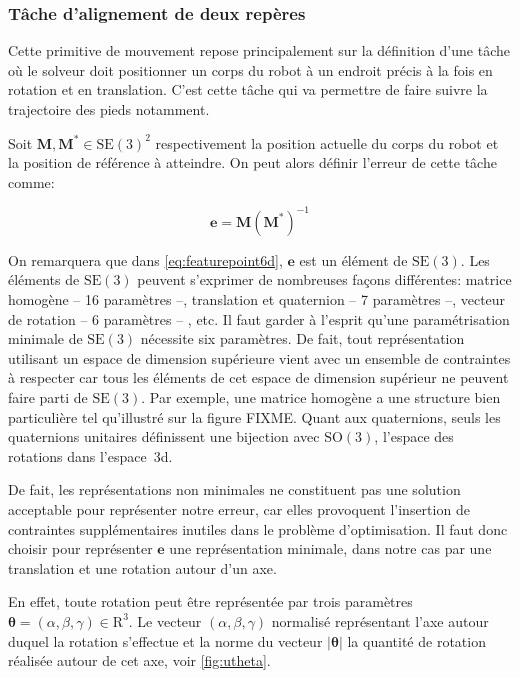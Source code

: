 \subsubsection{Tâche d'alignement de deux repères}

Cette primitive de mouvement repose principalement sur la définition
d'une tâche où le solveur doit positionner un corps du robot à un
endroit précis à la fois en rotation et en translation. C'est cette
tâche qui va permettre de faire suivre la trajectoire des pieds
notamment.


Soit $\mathbf{M}, \mathbf{M}^{*} \in \text{SE}(3)^2$
respectivement la position actuelle du corps du robot et la position
de référence à atteindre. On peut alors définir l'erreur de cette
tâche comme:

\begin{equation}\label{eq:featurepoint6d}
  \mathbf{e} = \mathbf{M} (\mathbf{M}^{*})^{-1}
\end{equation}

On remarquera que dans \autoref{eq:featurepoint6d}, $\mathbf{e}$ est
un élément de $\text{SE}(3)$. Les éléments de $\text{SE}(3)$ peuvent
s'exprimer de nombreuses façons différentes: matrice homogène -- 16
paramètres --, translation et quaternion -- 7 paramètres
--, vecteur de rotation -- 6 paramètres --
, etc. Il faut garder à l'esprit qu'une
paramétrisation minimale de $\text{SE}(3)$ nécessite six
paramètres. De fait, tout représentation utilisant un espace de
dimension supérieure vient avec un ensemble de contraintes à respecter
car tous les éléments de cet espace de dimension supérieur ne peuvent
faire parti de $\text{SE}(3)$. Par exemple, une matrice homogène a une
structure bien particulière tel qu'illustré sur la figure FIXME. Quant
aux quaternions, seuls les quaternions unitaires définissent une
bijection avec $\text{SO}(3)$, l'espace des rotations dans l'espace 3d.

De fait, les représentations non minimales ne constituent pas une
solution acceptable pour représenter notre erreur, car elles
provoquent l'insertion de contraintes supplémentaires inutiles dans le
problème d'optimisation. Il faut donc choisir pour représenter
$\mathbf{e}$ une représentation minimale, dans notre cas par une
translation et une rotation autour d'un axe.

En effet, toute rotation peut être représentée par trois paramètres
\mbox{$\mathbf{\theta} = (\alpha, \beta, \gamma) \in \mathrm{R}^3$}. Le
vecteur $(\alpha, \beta, \gamma)$ normalisé représentant l'axe autour
duquel la rotation s'effectue et la norme du vecteur
$|\mathbf{\theta}|$ la quantité de rotation réalisée autour de cet
axe, voir \autoref{fig:utheta}.

